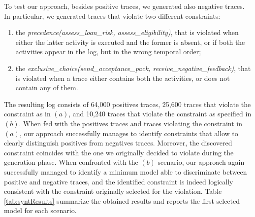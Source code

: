 To test our approach, besides positive traces, we generated also negative traces. In particular, we generated traces that violate two different constraints:
\begin{enumerate}[label=(\alph*)]
\item the \emph{precedence(assess\_loan\_risk, assess\_eligibility)}, that is violated when either the latter activity is executed and the former is absent, or if both the activities appear in the log, but in the wrong temporal order;
%
\item the \emph{exclusive\_choice(send\_acceptance\_pack, receive\_negative\_feedback)}, that is violated when a trace either contains both the activities, or does not contain any of them.
\end{enumerate}
%
The resulting log consists of 64,000 positives traces, 25,600 traces that violate the constraint as in $(a)$, and 10,240 traces that violate the constraint as specified in $(b)$.
%
When fed with the positives traces and traces violating the constraint in $(a)$, our approach successfully manages to identify constraints that allow to clearly distinguish positives from negatives traces. Moreover, the discovered constraint coincides with the one we originally decided to violate during the generation phase. When confronted with the $(b)$ scenario, our approach again successfully managed to identify a minimum model able to discriminate between positive and negative traces, and the identified constraint is indeed logically consistent with the constraint originally selected for the violation.
Table \ref{tab:syntResults} summarize the obtained results and reports the first selected model for each scenario.


